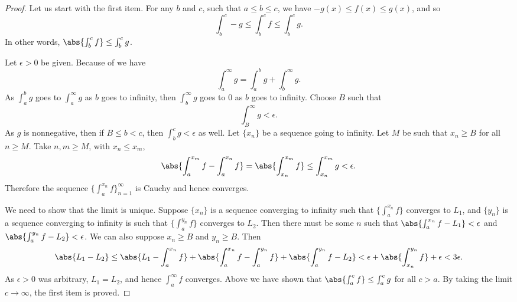 \documentclass[12pt]{book}
\begin{document}
\begin{proof}
Let us start with the first item.
For any $b$ and $c$, such that $a \leq b \leq c$, we have 
$-g(x) \leq f(x) \leq g(x)$, and so
\begin{equation*}
\int_b^c -g \leq \int_b^c f \leq \int_b^c g  .
\end{equation*}
In other words, $\abs{\int_b^c f} \leq \int_b^c g$.

Let $\epsilon > 0$ be given.
Because
of  we have
\begin{equation*}
\int_a^\infty g =
\int_a^b g +
\int_b^\infty g .
\end{equation*}
As $\int_a^b g$ goes to
$\int_a^\infty g$ as $b$ goes to infinity, then
$\int_b^\infty g$ goes to 0 as $b$ goes to infinity.
Choose $B$
such that
\begin{equation*}
\int_B^\infty g < \epsilon .
\end{equation*}
As $g$ is nonnegative, then if $B \leq b < c$, then
$\int_b^c g < \epsilon$ as well.
Let $\{ x_n \}$ be a sequence going to infinity.
Let $M$ be such that
$x_n \geq B$ for all $n \geq M$.
Take $n, m \geq M$,
with $x_n \leq x_m$,
\begin{equation*}
\abs{\int_a^{x_m} f - \int_a^{x_n} f} 
=
\abs{\int_{x_n}^{x_m} f} 
\leq \int_{x_n}^{x_m} g < \epsilon .
\end{equation*}
Therefore the sequence $\{ \int_a^{x_n} f \}_{n=1}^\infty$ is Cauchy and hence converges.

We need to show that the limit is unique.
Suppose $\{ x_n \}$ is a sequence
converging to infinity such that
$\{ \int_a^{x_n} f \}$ converges to $L_1$, and $\{ y_n \}$ is a sequence
converging to infinity is such that
$\{ \int_a^{y_n} f \}$ converges to $L_2$.
Then there must be some $n$ such
that
$\abs{\int_a^{x_n} f - L_1} < \epsilon$ and 
$\abs{\int_a^{y_n} f - L_2} < \epsilon$.
We can also suppose $x_n \geq B$
and $y_n \geq B$.
Then
\begin{equation*}
\abs{L_1 - L_2} \leq
\abs{L_1 - \int_a^{x_n} f}
+
\abs{\int_a^{x_n} f- \int_a^{y_n} f}
+
\abs{\int_a^{y_n} f - L_2}
<
\epsilon
+
\abs{\int_{x_n}^{y_n} f}
+
\epsilon
<
3 \epsilon.
\end{equation*}
As $\epsilon > 0$ was arbitrary, $L_1 = L_2$, and hence
$\int_a^\infty f$ converges.
Above we have shown that $\abs{\int_a^c f} \leq \int_a^c g$ for all $c > a$.
By taking the limit $c \to \infty$, the first item is proved.


\end{proof}
\end{document}
